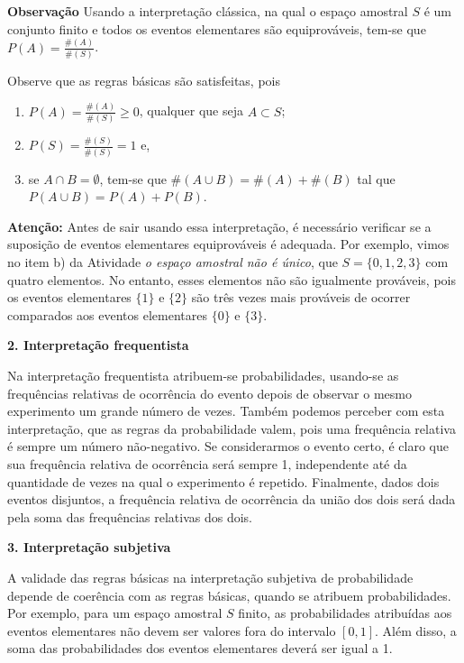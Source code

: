 \begin{observation}{ }

\textbf{Observação} Usando a interpretação clássica, na qual o espaço amostral \(S\) é um conjunto finito e todos os eventos elementares são equiprováveis, tem-se que \(P(A)=\frac{\#(A)}{\#(S)}\).

Observe que as regras básicas são satisfeitas, pois
\begin{enumerate}
\item {} 
\(P(A)=\displaystyle{\frac{\#(A)}{\#(S)}}\geq 0\), qualquer que seja \(A \subset S\);

\item {} 
\(P(S)=\displaystyle{\frac{\#(S)}{\#(S)}=1}\) e,

\item {} 
se \(A\cap B=\emptyset\), tem-se que \(\#(A\cup B)=\#(A)+\#(B)\) tal que \(P(A\cup B)=P(A)+P(B)\).

\end{enumerate}

\textbf{Atenção:} Antes de sair usando essa interpretação, é necessário verificar se a suposição de eventos elementares equiprováveis é adequada. Por exemplo, vimos no item b) da Atividade \emph{o espaço amostral não é único}, que \(S=\{0,1,2,3\}\) com quatro elementos. No entanto, esses elementos não são igualmente prováveis, pois os eventos elementares \(\{1\}\) e \(\{ 2\}\) são três vezes mais prováveis de ocorrer comparados aos eventos elementares \(\{0\}\) e \(\{3\}\).
\end{observation}

\textbf{2. Interpretação frequentista}

Na interpretação frequentista atribuem-se probabilidades, usando-se as frequências relativas de ocorrência do evento depois de observar o mesmo experimento um grande número de vezes. Também podemos perceber com esta interpretação, que as regras da probabilidade valem, pois uma frequência relativa é sempre um número não-negativo. Se considerarmos o evento certo, é claro que sua frequência relativa de ocorrência será sempre 1, independente até da quantidade de vezes na qual o experimento é repetido. Finalmente, dados dois eventos disjuntos, a frequência relativa de ocorrência da união dos dois será dada pela soma das frequências relativas dos dois.

\textbf{3. Interpretação subjetiva}

A validade das regras básicas na interpretação subjetiva de probabilidade depende de coerência com as regras básicas, quando se atribuem probabilidades. Por exemplo, para um espaço amostral \(S\) finito, as probabilidades atribuídas aos eventos elementares não devem ser valores fora do intervalo \([0,1]\). Além disso, a soma das probabilidades dos eventos elementares deverá ser igual a 1.



